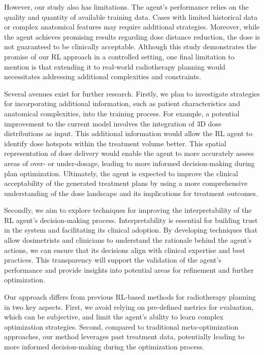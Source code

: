 However, our study also has limitations.
The agent's performance relies on the quality and quantity of available training data.
Cases with limited historical data or complex anatomical features may require additional strategies.
Moreover, while the agent achieves promising results regarding dose distance reduction, the dose is not guaranteed to be clinically acceptable.
Although this study demonstrates the promise of our RL approach in a controlled setting, one final limitation to mention is that extending it to real-world radiotherapy planning would necessitates addressing additional complexities and constraints.

Several avenues exist for further research.
Firstly, we plan to investigate strategies for incorporating additional information, such as patient characteristics and anatomical complexities, into the training process.
For example, a potential improvement to the current model involves the integration of 3D dose distributions as input.
This additional information would allow the RL agent to identify dose hotspots within the treatment volume better.
This spatial representation of dose delivery would enable the agent to more accurately assess areas of over- or under-dosage, leading to more informed decision-making during plan optimization.
Ultimately, the agent is expected to improve the clinical acceptability of the generated treatment plans by using a more comprehensive understanding of the dose landscape and its implications for treatment outcomes.

Secondly, we aim to explore techniques for improving the interpretability of the RL agent’s decision-making process.
Interpretability is essential for building trust in the system and facilitating its clinical adoption.
By developing techniques that allow dosimetrists and clinicians to understand the rationale behind the agent’s actions, we can ensure that its decisions align with clinical expertise and best practices.
This transparency will support the validation of the agent’s performance and provide insights into potential areas for refinement and further optimization.

Our approach differs from previous RL-based methods for radiotherapy planning in two key aspects.
First, we avoid relying on pre-defined metrics for evaluation, which can be subjective, and limit the agent's ability to learn complex optimization strategies.
Second, compared to traditional meta-optimization approaches, our method leverages past treatment data, potentially leading to more informed decision-making during the optimization process.

